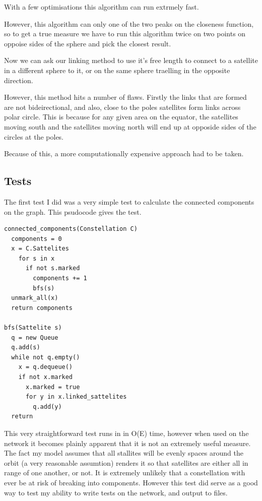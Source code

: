 \documentclass[12pt]{article}
\begin{document}
With a few optimisations this algorithm can run extrmely fast.

However, this algorithm can only one of the two peaks on the closeness function, so to get a true measure we have to run this algorithm twice on two points on oppoise sides of the sphere and pick the closest result.

Now we can ask our linking method to use it's free length to connect to a satellite in a different sphere to it, or on the same sphere traelling in the opposite direction.

However, this method hits a number of flaws. Firstly the links that are formed are not bideirectional, and also, close to the poles satellites form links across polar circle. This is because for any given area on the equator, the satellites moving south and the satellites moving north will end up at opposide sides of the circles at the poles.


Because of this, a more computationally expensive approach had to be taken.


\subsection{Tests}

The first test I did was a very simple test to calculate the connected components on the graph. This psudocode gives the test.

\begin{lstlisting}
connected_components(Constellation C)
  components = 0
  x = C.Sattelites
    for s in x
      if not s.marked
        components += 1
        bfs(s)
  unmark_all(x)
  return components

bfs(Sattelite s)
  q = new Queue
  q.add(s)
  while not q.empty()
    x = q.dequeue()
    if not x.marked
      x.marked = true
      for y in x.linked_sattelites
        q.add(y)
  return			
\end{lstlisting}

This very straightforward test runs in in O(E) time, however when used on the network it becomes plainly apparent that it is not an extremely useful measure. The fact my model assumes that all stallites will be evenly spaces around the orbit (a very reasonable assumtion) renders it so that satellites are either all in range of one another, or not. It is extremely unlikely that a constellation with ever be at risk of breaking into components. However this test did serve as a good way to test my ability to write tests on the network, and output to files.
\end{document}
